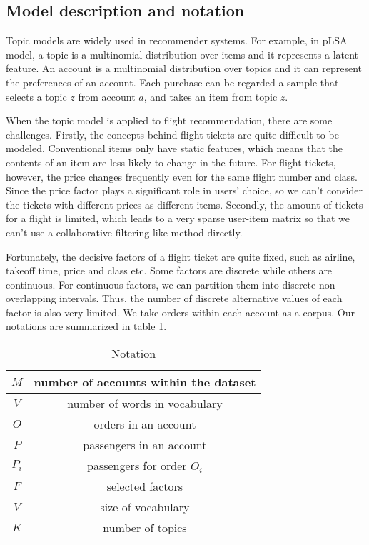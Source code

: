 \documentclass{llncs}
\begin{document}
\subsection{Model description and notation}
Topic models are widely used in recommender systems. For example, in pLSA model\cite{tomas:coll}, a topic is a multinomial distribution over items and it represents a latent feature. An account is a multinomial distribution over topics and it can represent the preferences of an account. Each purchase can be regarded a sample that selects a topic $z$ from account $a$, and takes an item from topic $z$.\par
When the topic model is applied to flight recommendation, there are some challenges. Firstly, the concepts behind flight tickets are quite difficult to be modeled. Conventional items only have static features, which means that the contents of an item are less likely to change in the future. For flight tickets, however, the price changes frequently even for the same flight number and class. Since the price factor plays a significant role in users' choice, so we can't consider the tickets with different prices as different items. Secondly, the amount of tickets for a flight is limited, which leads to a very sparse user-item matrix so that we can't use a collaborative-filtering like method directly.\par
Fortunately, the decisive factors of a flight ticket are quite fixed, such as airline, takeoff time, price and class etc. Some factors are discrete while others are continuous. For continuous factors, we can partition them into discrete non-overlapping intervals. Thus, the number of discrete alternative values of each factor is also very limited. We take orders within each account as a corpus. Our notations are summarized in table \ref{tab:not}.\par
\begin{table}[!htbp]
\centering
\caption{\label{tab:not}Notation}
\begin{tabular}{|c|c|} \hline
$M$ & number of accounts within the dataset\\ \hline
$V$ & number of words in vocabulary\\ \hline
$O$ & orders in an account\\ \hline
$P$ & passengers in an account\\ \hline
$P_i$ & passengers for order $O_i$ \\ \hline
$F$ & selected factors\\ \hline
$V$ & size of vocabulary\\ \hline
$K$ & number of topics\\ \hline
\end{tabular}
\end{table}
\end{document}
